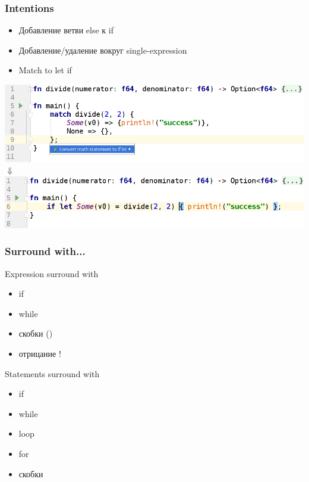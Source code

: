 \documentclass[10pt,pdf,hyperref={unicode}]{beamer}
\begin{document}
\begin{frame}
	\frametitle{Intentions} 
	\begin{itemize}
		\item Добавление ветви else к if
		\item Добавление/удаление {} вокруг single-expression
		\item Match to let if
	\end{itemize}
	\vfill
	\includegraphics[scale = 0.4]{match2let_if_before.png}\\
	{
	\centering
	$\Downarrow$ \\
	}
	\includegraphics[scale = 0.4]{match2let_if_after.png}
\end{frame}

\begin{frame}
	\frametitle{Surround with...} 
	\begin{block}{Expression surround with}
		\begin{itemize}
			\item if
			\item while
			\item скобки ()
			\item отрицание !
		\end{itemize}
	\end{block}
	
	\begin{block}{Statements surround with}
		\begin{itemize}
			\item if
			\item while
			\item loop
			\item for
			\item скобки {}
		\end{itemize}
	\end{block}
\end{frame}
\end{document}
